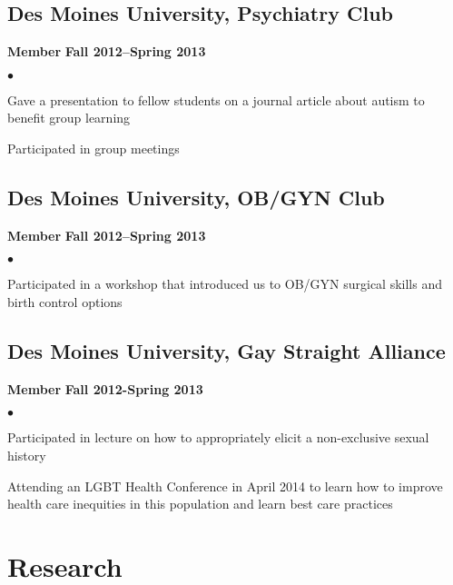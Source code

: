\documentclass[10pt,letterpaper]{article}
\renewenvironment{itemize}{
  \begin{list}{}{
      \setlength{\leftmargin}{1.5em}
      \setlength{\itemsep}{0.25em}
      \setlength{\parskip}{0pt}
      \setlength{\parsep}{0.25em}
    }
  }{
  \end{list}
}
\newenvironment{bitemize}{
  \begin{list}{$\bullet$}{
      \setlength{\leftmargin}{1.5em}
      \setlength{\itemsep}{0.25em}
      \setlength{\parskip}{0pt}
      \setlength{\parsep}{0.25em}
    }
  }{
  \end{list}
}
\newcommand{\yearrange}[1]{\hfill \textbf{#1} \par}
\begin{document}
\subsection*{Des Moines University, Psychiatry Club}
\begin{itemize}
\item \textbf{Member} \yearrange{Fall 2012--Spring 2013}
  \begin{bitemize}
  \item Gave a presentation to fellow students on a journal article about autism to benefit group learning
  \item Participated in group meetings
   \end{bitemize}
\end{itemize}

\subsection*{Des Moines University, OB/GYN Club}
\begin{itemize}
\item \textbf{Member} \yearrange{Fall 2012--Spring 2013}
  \begin{bitemize}
  \item Participated in a workshop that introduced us to OB/GYN surgical
  skills and birth control options
    \end{bitemize}
\end{itemize}

\subsection*{Des Moines University, Gay Straight Alliance}
\begin{itemize}
\item \textbf{Member} \yearrange{Fall 2012-Spring 2013}
  \begin{bitemize} 
 \item Participated in lecture on how to appropriately elicit a non-exclusive sexual history
 \item Attending an LGBT Health Conference in April 2014 to learn how to improve health care inequities in this population and learn best care practices 
  \end{bitemize}
\end{itemize}


\section*{Research}
\end{document}
